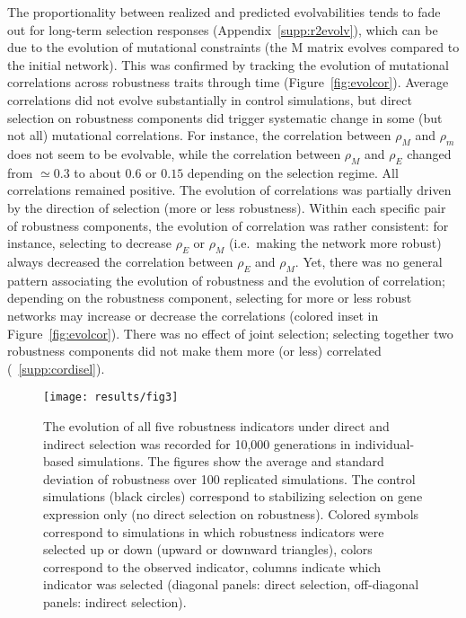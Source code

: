 \documentclass[10pt,a4paper]{article}
\newcommand{\earlyenv}{{\rho_E}}
\newcommand{\earlymut}{{\rho_M}}
\newcommand{\latemut}{{\rho_m}}
\newcommand{\M}{\bm{\mathrm M}}
\newcommand{\SupMat}{Appendix~}
\begin{document}
The proportionality between realized and predicted evolvabilities tends to fade out for long-term selection responses (\SupMat \ref{supp:r2evolv}), which can be due to the evolution of mutational constraints (the $\M$ matrix evolves compared to the initial network). This was confirmed by tracking the evolution of mutational correlations across robustness traits through time (Figure~\ref{fig:evolcor}). Average correlations did not evolve substantially in control simulations, but direct selection on robustness components did trigger systematic change in some (but not all) mutational correlations. For instance, the correlation between $\earlymut$ and $\latemut$ does not seem to be evolvable, while the correlation between $\earlymut$ and $\earlyenv$ changed from $\simeq 0.3$ to about $0.6$ or $0.15$ depending on the selection regime. All correlations remained positive. The evolution of correlations was partially driven by the direction of selection (more or less robustness). Within each specific pair of robustness components, the evolution of correlation was rather consistent: for instance, selecting to decrease $\earlyenv$ or $\earlymut$ (i.e.\ making the network more robust) always decreased the correlation between $\earlyenv$ and $\earlymut$. Yet, there was no general pattern associating the evolution of robustness and the evolution of correlation; depending on the robustness component, selecting for more or less robust networks may increase or decrease the correlations (colored inset in Figure~\ref{fig:evolcor}). There was no effect of joint selection; selecting together two robustness components did not make them more (or less) correlated (\Supmat~\ref{supp:cordisel}).

\begin{figure}[tp!]
\begin{adjustwidth}{-1.5in}{0in}
\begin{flushright}
\texttt{[image: results/fig3]}
\caption{\color{Gray} \label{fig:evol} The evolution of all five robustness indicators under direct and indirect selection was recorded for 10,000 generations in individual-based simulations. The figures show the average and standard deviation of robustness over 100 replicated simulations. The control simulations (black circles) correspond to stabilizing selection on gene expression only (no direct selection on robustness). Colored symbols correspond to simulations in which robustness indicators were selected up or down (upward or downward triangles), colors correspond to the observed indicator, columns indicate which indicator was selected (diagonal panels: direct selection, off-diagonal panels: indirect selection).}
\end{flushright}\end{adjustwidth}
\end{figure}
\end{document}
